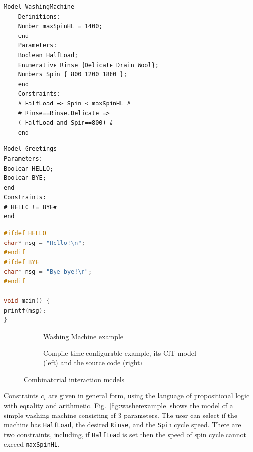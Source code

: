 \begin{tikzborder}{\cite{Gargantini16:validation}}
\newsavebox{\wmlisting}
\begin{lrbox}{\wmlisting}%
	\begin{lstlisting}[language=comb,basicstyle=\sffamily\scriptsize,frame=none]
	Model WashingMachine
	Definitions:
	Number maxSpinHL = 1400;
	end
	Parameters:
	Boolean HalfLoad;
	Enumerative Rinse {Delicate Drain Wool};
	Numbers Spin { 800 1200 1800 };
	end
	Constraints:
	# HalfLoad => Spin < maxSpinHL #
	# Rinse==Rinse.Delicate => 
	( HalfLoad and Spin==800) #
	end\end{lstlisting}
\end{lrbox}
	
\newsavebox{\hello}
\begin{lrbox}{\hello}%
\begin{lstlisting}[language=comb,basicstyle=\sffamily\scriptsize,frame=none]
Model Greetings
Parameters:
Boolean HELLO;
Boolean BYE;
end
Constraints:
# HELLO != BYE#
end
\end{lstlisting}\qquad
\begin{lstlisting}[language=C,basicstyle=\scriptsize,columns=fullflexible,frame=none]
#ifdef HELLO
char* msg = "Hello!\n";
#endif
#ifdef BYE
char* msg = "Bye bye!\n";
#endif

void main() {
printf(msg);
}
\end{lstlisting}
\end{lrbox}
	
	
	\begin{figure}[!htp]%
		\centering
			\begin{subfigure}[b]{0.49\textwidth}
			\usebox{\wmlisting}
			\caption{Washing Machine example}\label{fig:validation_washerexample}
		\end{subfigure}
		\begin{subfigure}[b]{0.49\textwidth}
			\centering
			\usebox{\hello}
			\caption{Compile time configurable example, its CIT model (left) and the source code (right)}\label{fig:compiletimeConf}
		\end{subfigure}
		\caption{Combinatorial interaction \citlab{} models}%
	\end{figure}
	
	\bb Constraints $c_i$ are given in general form, using the language of propositional logic with equality and arithmetic. 
	Fig.~\ref{fig:washerexample} shows the \citlab{} model
	of a simple washing machine consisting of 3 parameters. The user can select if the machine has \texttt{HalfLoad}, the desired \texttt{Rinse}, and the \texttt{Spin} cycle speed.
	There are two constraints, including,  if \texttt{HalfLoad} is set then the speed of spin cycle cannot exceed \texttt{maxSpinHL}.
	

\end{tikzborder}
